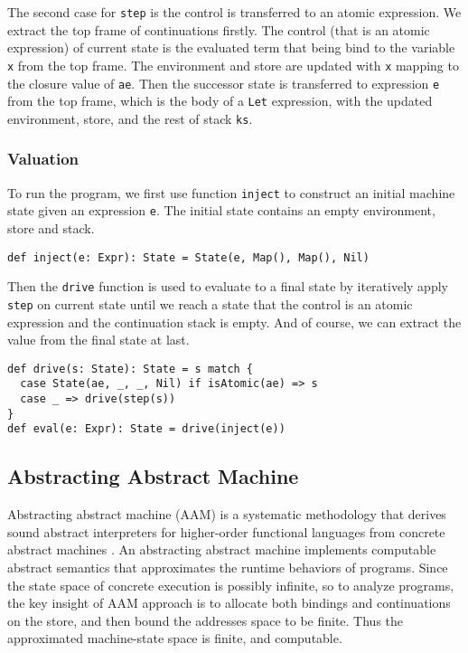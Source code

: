 \documentclass[acmsmall,review,anonymous]{acmart}\settopmatter{printfolios=true,printccs=false,printacmref=false}
\begin{document}
The second case for \texttt{step} is the control is transferred to an atomic expression.
We extract the top frame of continuations firstly.
The control (that is an atomic expression) of current state is the evaluated term
that being bind to the variable \texttt{x} from the top frame.
The environment and store are updated with \texttt{x} mapping to the closure value of \texttt{ae}.
Then the successor state is transferred to expression \texttt{e} from the top frame,
which is the body of a \texttt{Let} expression, with the updated environment, store, and
the rest of stack \texttt{ks}.

\subsubsection{Valuation}

To run the program, we first use function \texttt{inject} to construct an initial machine
state given an expression \texttt{e}. The initial state contains an empty environment, 
store and stack.
\begin{verbatim}
def inject(e: Expr): State = State(e, Map(), Map(), Nil)
\end{verbatim}

Then the \texttt{drive} function is used to evaluate
to a final state by iteratively apply \texttt{step} on current state until we reach a state
that the control is an atomic expression and the continuation stack is empty.
And of course, we can extract the value from the final state at last.

\begin{verbatim}
def drive(s: State): State = s match {
  case State(ae, _, _, Nil) if isAtomic(ae) => s
  case _ => drive(step(s))
}
def eval(e: Expr): State = drive(inject(e))
\end{verbatim}

\subsection{Abstracting Abstract Machine} \label{aam}
Abstracting abstract machine (AAM) is a systematic methodology that derives sound 
abstract interpreters for higher-order functional languages from concrete 
abstract machines \cite{van2012systematic, van2010abstracting}. 
An abstracting abstract machine implements computable abstract semantics that 
approximates the runtime behaviors of programs.
Since the state space of concrete execution is possibly infinite,
so to analyze programs, the key insight of AAM approach is to allocate both bindings
and continuations on the store, and then bound the addresses space to be finite.
Thus the approximated machine-state space is finite, and computable.
\end{document}
